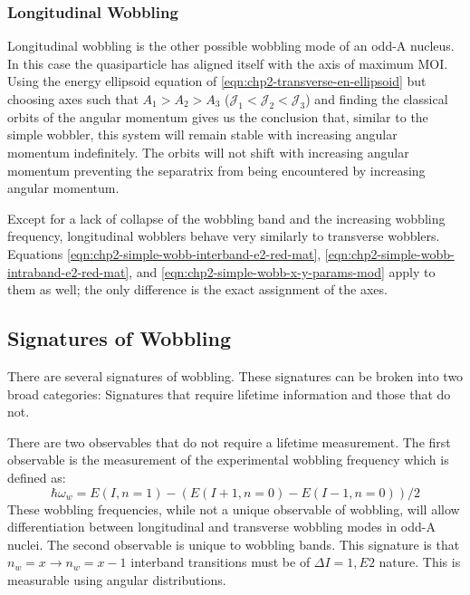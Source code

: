 \subsubsection{Longitudinal Wobbling}
\label{sssec:models-wobbling-longitudinal-wobbling}
Longitudinal wobbling is the other possible wobbling mode of an odd-A nucleus. In this case the quasiparticle has aligned itself with the axis of maximum MOI. Using the energy ellipsoid equation of \ref{eqn:chp2-transverse-en-ellipsoid} but choosing axes such that $A_1>A_2>A_3$ ($\mathcal{J}_1<\mathcal{J}_2<\mathcal{J}_3$) and finding the classical orbits of the angular momentum gives us the conclusion that, similar to the simple wobbler, this system will remain stable with increasing angular momentum indefinitely. The orbits will not shift with increasing angular momentum preventing the separatrix from being encountered by increasing angular momentum.

Except for a lack of collapse of the wobbling band and the increasing wobbling frequency, longitudinal wobblers behave very similarly to transverse wobblers. Equations \ref{eqn:chp2-simple-wobb-interband-e2-red-mat}, \ref{eqn:chp2-simple-wobb-intraband-e2-red-mat}, and \ref{eqn:chp2-simple-wobb-x-y-params-mod} apply to them as well; the only difference is the exact assignment of the axes.

\subsection{Signatures of Wobbling}
\label{ssec:models-wobbling-signatures}
There are several signatures of wobbling. These signatures can be broken into two broad categories: Signatures that require lifetime information and those that do not.

There are two observables that do not require a lifetime measurement. The first observable is the measurement of the experimental wobbling frequency which is defined as:
\begin{equation}
\label{eqn:chp2-exp-wob-frequencies}
\hbar\omega_w = E(I,n=1) - (E(I+1,n=0)-E(I-1,n=0))/2
\end{equation}
These wobbling frequencies, while not a unique observable of wobbling, will allow differentiation between longitudinal and transverse wobbling modes in odd-A nuclei. The second observable is unique to wobbling bands. This signature is that $n_w=x \rightarrow n_w=x-1$ interband transitions must be of $\Delta{}I=1, E2$ nature. This is measurable using angular distributions.
 
